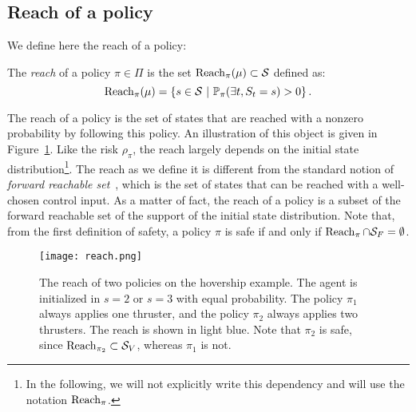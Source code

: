 \subsection{Reach of a policy}
We define here the reach of a policy:
\begin{definition}[Reach]
	The\emph{ reach} of a policy $\pi\in\Pi$ is the set $\operatorname{Reach}_\pi(\mu)\subset\mathcal{S}$ defined as:
	\begin{equation}
		\operatorname{Reach}_\pi(\mu) = \left\{s\in\mathcal{S}~\middle|~\mathbb{P}_\pi(\exists t, S_t = s) > 0\right\}. \label{eq:reach}
	\end{equation}
\end{definition}
The reach of a policy is the set of states that are reached with a nonzero probability by following this policy. An illustration of this object is given in Figure~\ref{fig:reach example}. Like the risk $\rho_\pi$, the reach largely depends on the initial state distribution\footnote{In the following, we will not explicitly write this dependency and will use the notation $\operatorname{Reach}_\pi$.}. The reach as we define it is different from the standard notion of\emph{ forward reachable set}~\cite{bansal2017hamilton}, which is the set of states that can be reached with a well-chosen control input. As a matter of fact, the reach of a policy is a subset of the forward reachable set of the support of the initial state distribution. Note that, from the first definition of safety, a policy $\pi$ is safe if and only if $\operatorname{Reach}_\pi \cap{\ensuremath{\mathcal{S}}_{F}} = \emptyset$.
\begin{figure}
	\centering
	\texttt{[image: reach.png]}
	\caption[Reach of a policy]{The reach of two policies on the hovership example. The agent is initialized in $s=2$ or $s=3$ with equal probability. The policy $\pi_1$ always applies one thruster, and the policy $\pi_2$ always applies two thrusters. The reach is shown in light blue. Note that $\pi_2$ is safe, since $\operatorname{Reach}_{\pi_2} \subset{\ensuremath{\mathcal{S}}_{V}}$, whereas $\pi_1$ is not.}
	\label{fig:reach example}
\end{figure}

